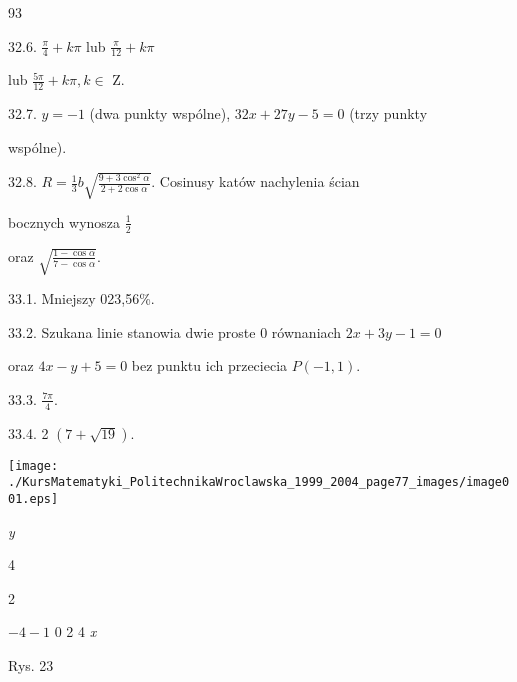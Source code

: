 \documentclass[a4paper,12pt]{article}
\begin{document}
93

32.6. $\displaystyle \frac{\pi}{4}+k\pi$ lub $\displaystyle \frac{\pi}{12}+k\pi$

lub $\displaystyle \frac{5\pi}{12}+k\pi,  k\in$ Z.

32.7. $y=-1$ (dwa punkty wspólne), $32x+27y-5=0$ (trzy punkty

wspólne).

32.8. $R = \displaystyle \frac{1}{3}b \sqrt{\frac{9+3\cos^{2}\alpha}{2+2\cos\alpha}}$. Cosinusy katów nachylenia ścian

bocznych wynosza $\displaystyle \frac{1}{2}$

oraz $\sqrt{\frac{1-\cos\alpha}{7-\cos\alpha}}.$

33.1. Mniejszy 023,56\%.

33.2. Szukana linie stanowia dwie proste $0$ równaniach $2x+3y-1=0$

oraz $4x-y+5=0$ bez punktu ich przeciecia $P(-1,1).$

33.3. $\displaystyle \frac{7\pi}{4}.$

33.4. 2 $(7+\sqrt{19}).$
\begin{center}
\texttt{[image: ./KursMatematyki\_PolitechnikaWroclawska\_1999\_2004\_page77\_images/image001.eps]}
\end{center}
{\it y}

4

2

$-4  -1$  0 2  4  {\it x}

Rys. 23
\end{document}
